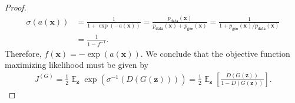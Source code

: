 \documentclass[table]{article}
\def\*#1{\mathbf{#1}}
\DeclareMathOperator{\ex}{\mathbb{E}}
\begin{document}
\begin{proof}
\begin{align*}
  \sigma(a(\*x)) &= \frac{1}{1+\exp(-a(\*x))} =  \frac{p_\textsf{data}(\*x)}{p_\textsf{data}(\*x) + p_\textsf{gen}(\*x)} = \frac{1}{1+p_\textsf{gen}(\*x)/p_\textsf{data}(\*x)} \\
                 &= \frac{1}{1-f^{-1}}.
\end{align*}
Therefore, $f(\*x) = -\exp(a(\*x))$. We conclude that the objective function maximizing likelihood must be given by
\begin{align*}
  J^{(G)} = \frac{1}{2}\ex_{\*z} \exp(\sigma^{-1}(D(G(\*z)))) = \frac{1}{2}\ex_{\*z} \left[\frac{D(G(\*z))}{1 - D(G(\*z))} \right].
\end{align*}
\end{proof}
\end{document}
